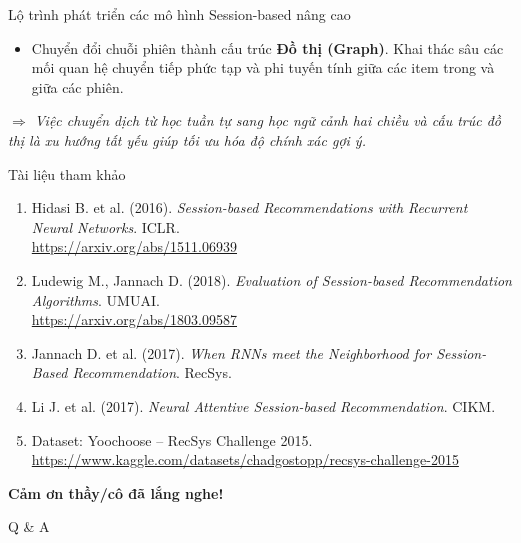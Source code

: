 \documentclass[aspectratio=169, 11pt]{beamer}
\begin{document}
\begin{frame}{Lộ trình phát triển các mô hình Session-based nâng cao}
\begin{itemize}
        \item \textbf{\color{blue!80!black}{SR-GNN (Khắc phục cấu trúc tuần tự đơn điệu):}}
        Chuyển đổi chuỗi phiên thành cấu trúc \textbf{Đồ thị (Graph)}. Khai thác sâu các mối quan hệ chuyển tiếp phức tạp và phi tuyến tính giữa các item trong và giữa các phiên.
    \end{itemize}

    \vspace{0.1cm}
    \begin{center}
        \footnotesize\color{gray}
        \textit{$\Rightarrow$ Việc chuyển dịch từ học tuần tự sang học ngữ cảnh hai chiều và cấu trúc đồ thị là xu hướng tất yếu giúp tối ưu hóa độ chính xác gợi ý.}
    \end{center}
\end{frame}

\begin{frame}{Tài liệu tham khảo}
\small
\begin{enumerate}
    \item Hidasi B. et al. (2016). \textit{Session-based Recommendations with Recurrent Neural Networks}. ICLR.\\
    \url{https://arxiv.org/abs/1511.06939}
    
    \item Ludewig M., Jannach D. (2018). \textit{Evaluation of Session-based Recommendation Algorithms}. UMUAI.\\
    \url{https://arxiv.org/abs/1803.09587}
    
    \item Jannach D. et al. (2017). \textit{When RNNs meet the Neighborhood for Session-Based Recommendation}. RecSys.
    
    \item Li J. et al. (2017). \textit{Neural Attentive Session-based Recommendation}. CIKM.
    
    \item Dataset: Yoochoose -- RecSys Challenge 2015.\\
    \url{https://www.kaggle.com/datasets/chadgostopp/recsys-challenge-2015}
\end{enumerate}
\end{frame}

\begin{frame}
\centering
\Huge\textbf{Cảm ơn thầy/cô đã lắng nghe!}

\vspace{1cm}
\Large Q \& A
\end{frame}
\end{document}

